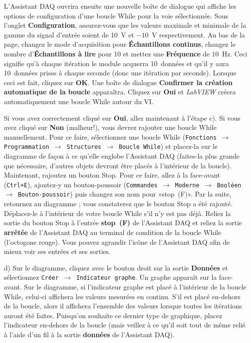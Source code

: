 \documentclass[canadien,12pt,oneside,letterpaper]{article}
\begin{document}
L'Assistant DAQ ouvrira ensuite une nouvelle boîte de dialogue qui affiche les options de configuration d'une boucle While pour la voie sélectionnée. Sous l'onglet \textbf{Configuration}, assurez-vous que les valeurs maximale et minimale de la gamme du signal d'entrée soient de 10~V et $-10$~V respectivement. Au bas de la page, changez le mode d'acquisition pour \textbf{Échantillons continus}, changez le nombre d'\textbf{Échantillons à lire} pour 10 et mettez une \textbf{Fréquence} de 10~Hz. Ceci signifie qu'à chaque itération le module acquerra 10~données et qu'il y aura 10~données prises à chaque seconde (donc une itération par seconde). Lorsque ceci est fait, cliquez sur \textbf{OK}. Une boîte de dialogue \textbf{Confirmer la création automatique de la boucle} apparaîtra. Cliquez sur \textbf{Oui} et \textit{LabVIEW} créera automatiquement une boucle While autour du VI.

Si vous avez correctement cliqué sur \textbf{Oui}, allez maintenant à l'étape c). Si vous avez cliqué sur \textbf{Non} (malheur!), vous devrez rajouter une boucle While manuellement. Pour ce faire, sélectionnez une boucle While (\texttt{Fonctions $\rightarrow$ Programmation $\rightarrow$ Structures $\rightarrow$ Boucle While}) et placez-la sur le diagramme de façon à ce qu'elle englobe l'Assistant DAQ (faites-la plus grande que nécessaire, d'autres objets devront être placés à l'intérieur de la boucle). Maintenant, rajoutez un bouton Stop. Pour ce faire, allez à la face-avant (\texttt{Ctrl+E}), ajoutez-y un bouton-poussoir (\texttt{Commandes $\rightarrow$ Moderne $\rightarrow$ Booléen $\rightarrow$ Bouton-poussoir}) puis changez son nom pour «stop~(F)». Par la suite, retournez au diagramme ; vous constaterez que le bouton Stop a été rajouté. Déplacez-le à l'intérieur de votre boucle While s'il n'y est pas déjà. Reliez la sortie du bouton Stop à l'entrée \textbf{stop~(F)} de l'Assistant DAQ et reliez la sortie \textbf{arrêtée} de l'Assistant DAQ au terminal de condition de la boucle While (l'octogone rouge). Vous pouvez agrandir l'icône de l'Assistant DAQ afin de mieux voir ses entrées et ses sorties.

d) Sur le diagramme, cliquez avec le bouton droit sur la sortie \textbf{Données} et sélectionnez \texttt{Créer $\rightarrow$ Indicateur graphe}. Un graphe apparaît sur la face-avant. Sur le diagramme, si l'indicateur graphe est placé à l'intérieur de la boucle While, celui-ci affichera les valeurs mesurées en continu. S'il est placé en-dehors de la boucle, alors il affichera l'ensemble des valeurs lorsque toutes les itérations auront été faites. Puisqu'on souhaite ce dernier type de graphique, placez l'indicateur en-dehors de la boucle (mais veillez à ce qu'il soit tout de même relié à l'aide d'un fil à la sortie \textbf{données} de l'Assistant DAQ).
\end{document}
